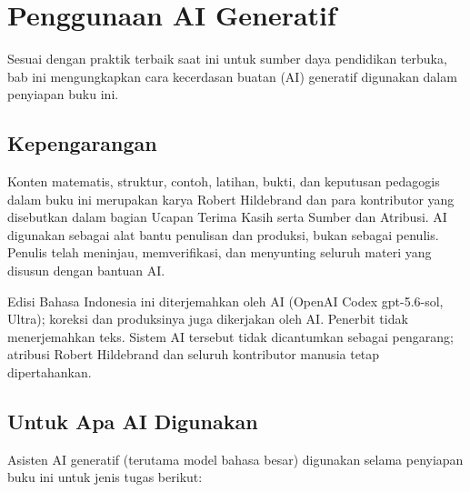 \chapter*{Penggunaan AI Generatif}

Sesuai dengan praktik terbaik saat ini untuk sumber daya pendidikan terbuka,
bab ini mengungkapkan cara kecerdasan buatan (AI) generatif digunakan
dalam penyiapan buku ini.

\section*{Kepengarangan}

Konten matematis, struktur, contoh, latihan, bukti, dan keputusan pedagogis
dalam buku ini merupakan karya Robert Hildebrand dan para kontributor yang
disebutkan dalam bagian Ucapan Terima Kasih serta Sumber dan Atribusi. AI
digunakan sebagai alat bantu penulisan dan produksi, bukan sebagai penulis.
Penulis telah meninjau, memverifikasi, dan menyunting seluruh materi yang
disusun dengan bantuan AI.

Edisi Bahasa Indonesia ini diterjemahkan oleh AI (OpenAI Codex gpt-5.6-sol, Ultra);
koreksi dan produksinya juga dikerjakan oleh AI. Penerbit tidak menerjemahkan teks. Sistem AI tersebut
tidak dicantumkan sebagai pengarang; atribusi Robert Hildebrand dan seluruh
kontributor manusia tetap dipertahankan.

\section*{Untuk Apa AI Digunakan}

Asisten AI generatif (terutama model bahasa besar) digunakan selama
penyiapan buku ini untuk jenis tugas berikut:

